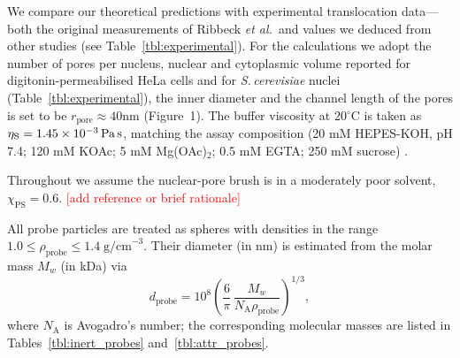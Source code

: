 \documentclass[10pt, a4paper]{article}
\newcommand\todo[1]{\textcolor{red}{#1}}
\begin{document}
\begin{multicols}{2}

We compare our theoretical predictions with experimental translocation data—both the original measurements of Ribbeck \textit{et al.}\,\cite{Ribbeck2001} and values we deduced from other studies \cite{Mohr2009,Popken2015,Timney2016,Frey2018} (see Table~\ref{tbl:experimental}).  
For the calculations we adopt the number of pores per nucleus, nuclear and cytoplasmic volume reported for digitonin-permeabilised HeLa cells \cite{Ribbeck2001} and for \textit{S.\,cerevisiae} nuclei \cite{Timney2016} (Table~\ref{tbl:experimental}), the inner diameter and the channel length of the pores is set to be $r_{\text{pore}}\approx 40 \text{nm}$ (Figure~1).
The buffer viscosity at 20$^\circ$C is taken as $\eta_{\text{S}} = 1.45\times10^{-3}\,\text{Pa\,s}$, matching the assay composition (20 mM HEPES-KOH, pH 7.4; 120 mM KOAc; 5 mM Mg(OAc)$_2$; 0.5 mM EGTA; 250 mM sucrose) \cite{Ribbeck2001}.

Throughout we assume the nuclear-pore brush is in a moderately poor solvent, $\chi_{\text{PS}} = 0.6$. \todo{[add reference or brief rationale]}

All probe particles are treated as spheres with densities in the range $1.0 \le \rho_{\text{probe}} \le 1.4\;\text{g/cm}^{-3}$.  Their
diameter (in nm) is estimated from the molar mass $M_{w}$ (in kDa) via
\begin{equation}
  d_{\text{probe}}
  = 10^{8}
    \left(
      \frac{6}{\pi}\,
      \frac{M_{w}}{N_{\text{A}}\rho_{\text{probe}}}
    \right)^{\!1/3},
  \label{eq:d_probe}
\end{equation}
where $N_{\text{A}}$ is Avogadro's number; the corresponding molecular masses are listed in Tables~\ref{tbl:inert_probes} and~\ref{tbl:attr_probes}.


\end{multicols}
\end{document}
